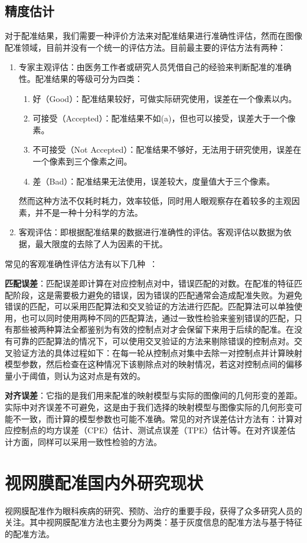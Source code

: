 \subsection{精度估计}
对于配准结果，我们需要一种评价方法来对配准结果进行准确性评估，然而在图像配准领域，目前并没有一个统一的评估方法。目前最主要的评估方法有两种：
\begin{enumerate}
\item 专家主观评估：由医务工作者或研究人员凭借自己的经验来判断配准的准确性。配准结果的等级可分为四类：
\begin{enumerate}
\item 好（Good）：配准结果较好，可做实际研究使用，误差在一个像素以内。
\item 可接受（Accepted）：配准结果不如(a)，但也可以接受，误差大于一个像素。
\item 不可接受（Not Accepted）：配准结果不够好，无法用于研究使用，误差在一个像素到三个像素之间。
\item 差（Bad）：配准结果无法使用，误差较大，度量值大于三个像素。
\end{enumerate}
然而这种方法不仅耗时耗力，效率较低，同时用人眼观察存在着较多的主观因素，并不是一种十分科学的方法。
\item 客观评估：即根据配准结果的数据进行准确性的评估。客观评估以数据为依据，最大限度的去除了人为因素的干扰。
\end{enumerate}
常见的客观准确性评估方法有以下几种~\cite{ume}：

\textbf{匹配误差}：匹配误差即计算在对应控制点对中，错误匹配的对数。在配准的特征匹配阶段，这是需要极力避免的错误，因为错误的匹配通常会造成配准失败。为避免错误的匹配，可以采用匹配算法和交叉验证的方法进行匹配。匹配算法可以单独使用，也可以同时使用两种不同的匹配算法，通过一致性检验来鉴别错误的匹配，只有那些被两种算法全都鉴别为有效的控制点对才会保留下来用于后续的配准。在没有可靠的匹配算法的情况下，可以使用交叉验证的方法来剔除错误的控制点对。交叉验证方法的具体过程如下：在每一轮从控制点对集中去除一对控制点并计算映射模型参数，然后检查在这种情况下该剔除点对的映射情况，若这对控制点间的偏移量小于阈值，则认为这对点是有效的。

\textbf{对齐误差}：它指的是我们用来配准的映射模型与实际的图像间的几何形变的差距。实际中对齐误差不可避免，这是由于我们选择的映射模型与图像实际的几何形变可能不一致，而计算的模型参数也可能不准确。常见的对齐误差估计方法有：计算对应控制点的均方误差（CPE）估计、测试点误差（TPE）估计等。在对齐误差估计方面，同样可以采用一致性检验的方法。

\section{视网膜配准国内外研究现状}
视网膜配准作为眼科疾病的研究、预防、治疗的重要手段，获得了众多研究人员的关注。其中视网膜配准方法也主要分为两类：基于灰度信息的配准方法与基于特征的配准方法。

